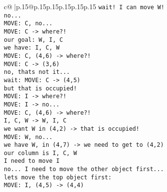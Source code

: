 \documentclass{article}
\begin{document}
{\begin{supertabular}{c@{$\;$}|p{.15\linewidth}@{}p{.15\linewidth}p{.15\linewidth}p{.15\linewidth}p{.15\linewidth}p{.15\linewidth}}
{{{\tt  wait! I can move W!\\ \tt  no...\\ \tt  MOVE: C, no...\\ \tt  MOVE: C -> where?!\\ \tt  our goal: W, I, C \\ \tt  we have: I, C, W \\ \tt  MOVE: C, (4,6) -> where?!\\ \tt  MOVE: C -> (3,6) \\ \tt  no, thats not it...\\ \tt  wait: MOVE: C -> (4,5) \\ \tt  but that is occupied!\\ \tt  MOVE: I -> where?!\\ \tt  MOVE: I -> no...\\ \tt  MOVE: C, (4,6) -> where?!\\ \tt  I, C, W -> W, I, C\\ \tt  we want W in (4,2) -> that is occupied!\\ \tt  MOVE: W, no...\\ \tt  we have W, in (4,7) -> we need to get to (4,2) \\ \tt  our column is I, C, W \\ \tt  I need to move I \\ \tt  no... I need to move the other object first...\\ \tt  lets move the top object first: \\ \tt  MOVE: I, (4,5) -> (4,4) \\ \tt}}}
\end{supertabular}}
\end{document}
